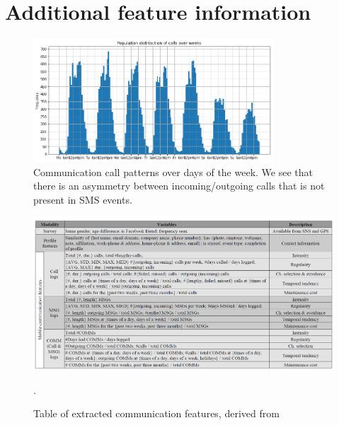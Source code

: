 \documentclass[acmlarge]{acmart}
\begin{document}
\section{Additional feature information}

\begin{figure}
    \centering
    \includegraphics[width=0.8\textwidth]{figures/call_trend.png}
    \caption{Communication call patterns over days of the week. We see that there is an asymmetry between incoming/outgoing calls that is not present in SMS events.}
    \label{fig:comm_patterns}
\end{figure}

\begin{figure}
    \centering
    \includegraphics[width=1\textwidth]{figures/feature_extraction_placeholder.png}
    \caption{Table of extracted communication features, derived from~\cite{min2013mining}}.
    \label{fig:comm_features}
\end{figure}

\pagebreak

\pagebreak



\end{document}
